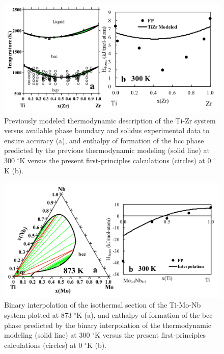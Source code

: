 \newpage
\begin{figure}[H]
	\centering
	\includegraphics[width=\textwidth]{Chapter-3/Figures/TiZr.png}
	\caption{Previously modeled thermodynamic description of the Ti-Zr system versus available phase boundary and solidus experimental data to ensure accuracy \cite{Kumar1994a} (a), and enthalpy of formation of the bcc phase predicted by the previous thermodynamic modeling (solid line) at 300 $^{\circ}$K versus the present first-principles calculations (circles) at 0 $^{\circ}$K (b).}
	\label{Ch3-figure:TiZr}
\end{figure}

\newpage
\begin{figure}[H]
	\centering
	\includegraphics[width=\textwidth]{Chapter-3/Figures/TiMoNb.png}
	\caption{Binary interpolation of the isothermal section of the Ti-Mo-Nb system plotted at 873 $^{\circ}$K (a), and enthalpy of formation of the bcc phase predicted by the binary interpolation of the thermodynamic modeling (solid line) at 300 $^{\circ}$K versus the present first-principles calculations (circles) at 0 $^{\circ}$K (b).}
	\label{Ch3-figure:TiMoNb}
\end{figure}

